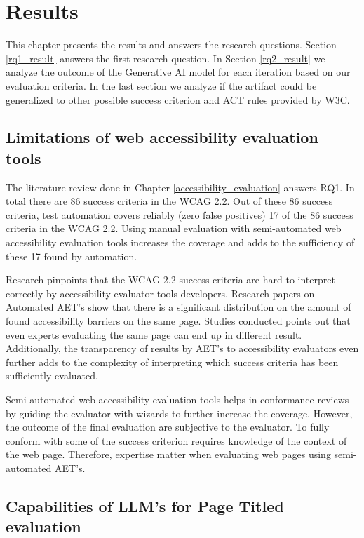 \chapter{Results\label{results}}

This chapter presents the results and answers the research questions. Section \ref{rq1_result} answers the first research question. In Section \ref{rq2_result} we analyze the outcome of the Generative AI model for each iteration based on our evaluation criteria. In the last section we analyze if the artifact could be generalized to other possible success criterion and ACT rules provided by W3C.

\section{Limitations of web accessibility evaluation tools\label{rq1_result}}

The literature review done in Chapter \ref{accessibility_evaluation} answers RQ1. In total there are 86 success criteria in the WCAG 2.2. Out of these 86 success criteria, test automation covers reliably (zero false positives) 17 of the 86 success criteria in the WCAG 2.2. Using manual evaluation with semi-automated web accessibility evaluation tools increases the coverage and adds to the sufficiency of these 17 found by automation.

Research pinpoints that the WCAG 2.2 success criteria are hard to interpret correctly by accessibility evaluator tools developers. Research papers on Automated AET's show that there is a significant distribution on the amount of found accessibility barriers on the same page. Studies conducted points out that even experts evaluating the same page can end up in different result. Additionally, the transparency of results by AET's to accessibility evaluators even further adds to the complexity of interpreting which success criteria has been sufficiently evaluated.

Semi-automated web accessibility evaluation tools helps in conformance reviews by guiding the evaluator with wizards to further increase the coverage. However, the outcome of the final evaluation are subjective to the evaluator. To fully conform with some of the success criterion requires knowledge of the context of the web page. Therefore, expertise matter when evaluating web pages using semi-automated AET's.

\section{Capabilities of LLM's for Page Titled evaluation\label{rq2_result}}

